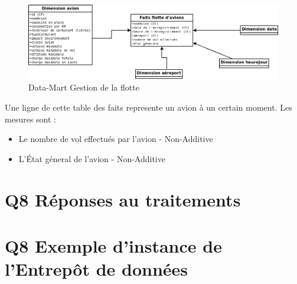 \documentclass[oneside,13pt,a4paper]{article}
\begin{document}
\begin{figure}[h]
  \centering
  \includegraphics[width=1\textwidth]{img/flotteAvions.png}
  \caption{Data-Mart Gestion de la flotte}
\end{figure}

Une ligne de cette table des faits represente un avion à un certain moment. Les mesures sont :
\begin{itemize}
  \item Le nombre de vol effectués par l'avion - Non-Additive
  \item L'État géneral de l'avion - Non-Additive
\end{itemize}

\section{Q8 Réponses au traitements}

\section{Q8 Exemple d'instance de l'Entrepôt de données}
\end{document}

